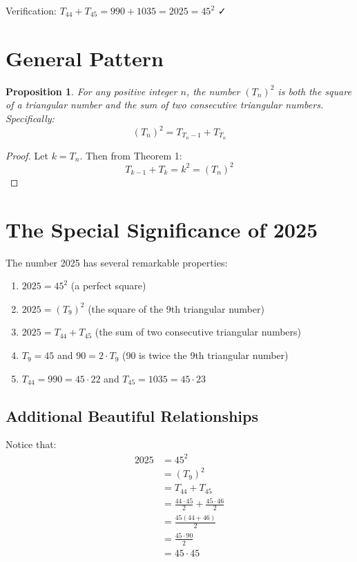 \documentclass[12pt]{article}
\newtheorem{proposition}{Proposition}
\begin{document}
Verification: $T_{44} + T_{45} = 990 + 1035 = 2025 = 45^2$ ✓

\section*{General Pattern}

\begin{proposition}
For any positive integer $n$, the number $(T_n)^2$ is both the square of a triangular number and the sum of two consecutive triangular numbers. Specifically:
\begin{equation}
(T_n)^2 = T_{T_n - 1} + T_{T_n}
\end{equation}
\end{proposition}

\begin{proof}
Let $k = T_n$. Then from Theorem 1:
\begin{equation}
T_{k-1} + T_k = k^2 = (T_n)^2
\end{equation}
\end{proof}

\section*{The Special Significance of 2025}

The number 2025 has several remarkable properties:

\begin{enumerate}
\item $2025 = 45^2$ (a perfect square)
\item $2025 = (T_9)^2$ (the square of the 9th triangular number)
\item $2025 = T_{44} + T_{45}$ (the sum of two consecutive triangular numbers)
\item $T_9 = 45$ and $90 = 2 \cdot T_9$ (90 is twice the 9th triangular number)
\item $T_{44} = 990 = 45 \cdot 22$ and $T_{45} = 1035 = 45 \cdot 23$
\end{enumerate}

\subsection*{Additional Beautiful Relationships}

Notice that:
\begin{align*}
2025 &= 45^2 \\
&= (T_9)^2 \\
&= T_{44} + T_{45} \\
&= \frac{44 \cdot 45}{2} + \frac{45 \cdot 46}{2} \\
&= \frac{45(44 + 46)}{2} \\
&= \frac{45 \cdot 90}{2} \\
&= 45 \cdot 45
\end{align*}
\end{document}
